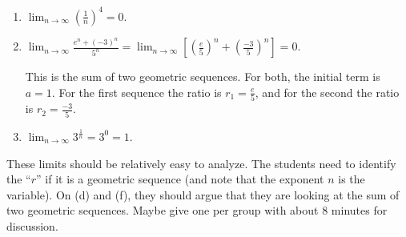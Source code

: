 \documentclass[]{ximera}
\begin{document}
\begin{problem}
\begin{freeResponse}
\begin{enumerate}
	\item  $\lim_{n \to \infty} \left( \frac{1}{n} \right)^4 = 0$.  
	
	\item  $\lim_{n \to \infty} \frac{e^n + (-3)^n}{5^n} = \lim_{n \to \infty} \left[ \left( \frac{e}{5} \right)^n + \left( \frac{-3}{5} \right)^n \right] = 0.$  
	
	This is the sum of two geometric sequences.  
	For both, the initial term is $a = 1$.  
	For the first sequence the ratio is $r_1 = \frac{e}{5}$, and for the second the ratio is $r_2 = \frac{-3}{5}$.
	
	\item  $\lim_{n \to \infty} 3^\frac{1}{n} = 3^0 = 1$.  
	
	\end{enumerate}
	\end{freeResponse}

\end{problem}

\begin{instructorNotes}
These limits should be relatively easy to analyze.  
The students need to identify the ``$r$'' if it is a geometric sequence (and note that the exponent $n$ is the variable).  
On (d) and (f), they should argue that they are looking at the sum of two geometric sequences.  
Maybe give one per group with about $8$ minutes for discussion.  
\end{instructorNotes}
















	
	
	
	
	
	
	
	
	

	










								
				
				
	
\end{document}
